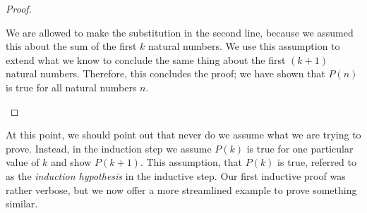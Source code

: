 \documentclass[twoside]{report}
\begin{document}
\begin{proof}
\begin{enumerate}
		We are allowed to make the substitution in the second line, because we assumed this about the sum of the first $k$ natural numbers. We use this assumption to extend what we know to conclude the same thing about the first $(k + 1)$ natural numbers. Therefore, this concludes the proof; we have shown that $P(n)$ is true for all natural numbers $n$.
	\end{enumerate}
\end{proof}
\vspace{\baselineskip}

At this point, we should point out that never do we assume what we are trying to prove. Instead, in the induction step we assume $P(k)$ is true for one particular value of $k$ and show $P(k + 1)$. This assumption, that $P(k)$ is true, referred to as the \emph{induction hypothesis} in the inductive step. Our first inductive proof was rather verbose, but we now offer a more streamlined example to prove something similar.
\end{document}
